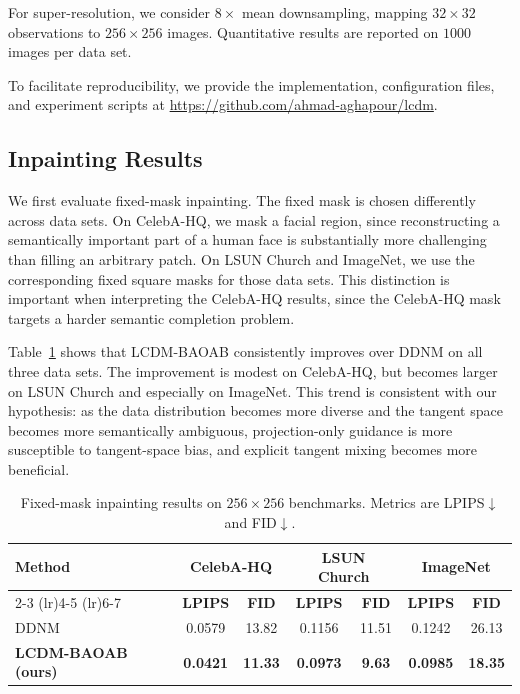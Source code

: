 \documentclass[twoside,11pt]{article}
\numberwithin{equation}{section}
\begin{document}
For super-resolution, we consider \(8\times\) mean downsampling, mapping
\(32\times32\) observations to \(256\times256\) images. Quantitative results are
reported on \(1000\) images per data set.

To facilitate reproducibility, we provide the implementation, configuration files,
and experiment scripts at
\url{https://github.com/ahmad-aghapour/lcdm}.
\subsection{Inpainting Results}


We first evaluate fixed-mask inpainting. The fixed mask is chosen differently
across data sets. On CelebA-HQ, we mask a facial region, since reconstructing a
semantically important part of a human face is substantially more challenging
than filling an arbitrary patch. On LSUN Church and ImageNet, we use the
corresponding fixed square masks for those data sets. This distinction is
important when interpreting the CelebA-HQ results, since the CelebA-HQ mask
targets a harder semantic completion problem.

Table~\ref{tab:inpainting_all} shows that LCDM-BAOAB consistently improves over
DDNM on all three data sets. The improvement is modest on CelebA-HQ, but becomes
larger on LSUN Church and especially on ImageNet. This trend is consistent with
our hypothesis: as the data distribution becomes more diverse and the tangent
space becomes more semantically ambiguous, projection-only guidance is more
susceptible to tangent-space bias, and explicit tangent mixing becomes more
beneficial.

\begin{table}[ht]
\centering
\begin{tabular}{lcccccc}
\toprule
\textbf{Method}
& \multicolumn{2}{c}{\textbf{CelebA-HQ}}
& \multicolumn{2}{c}{\textbf{LSUN Church}}
& \multicolumn{2}{c}{\textbf{ImageNet}} \\
\cmidrule(lr){2-3} \cmidrule(lr){4-5} \cmidrule(lr){6-7}
& \textbf{LPIPS} & \textbf{FID}
& \textbf{LPIPS} & \textbf{FID}
& \textbf{LPIPS} & \textbf{FID} \\
\midrule
DDNM
& 0.0579 & 13.82
& 0.1156 & 11.51
& 0.1242 & 26.13 \\
\textbf{LCDM-BAOAB (ours)}
& \textbf{0.0421} & \textbf{11.33}
& \textbf{0.0973} & \textbf{9.63}
& \textbf{0.0985} & \textbf{18.35} \\
\bottomrule
\end{tabular}
\caption{Fixed-mask inpainting results on \(256\times256\) benchmarks. Metrics are LPIPS\(\downarrow\) and FID\(\downarrow\).}\label{tab:inpainting_all}
\end{table}
\end{document}
